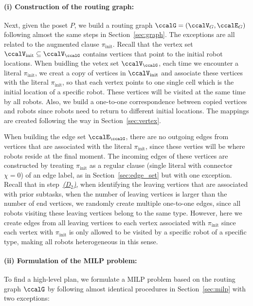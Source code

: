 \documentclass[Afour,sageh,times]{sagej}
\newcounter{mycounter}
\begin{document}
{{{  \paragraph{(i) Construction of the routing graph:}   Next, given the poset $P$, we build a routing graph $\ccalG = (\ccalV_G, \ccalE_G)$ following almost the same steps in Section~\ref{sec:graph}. The exceptions are all related to the augmented clause $\pi_{\text{init}}$.  Recall that the vertex set $\ccalV_\text{init} \subseteq \ccalV_\ccalG$ contains vertices that point to the initial robot locations. When buidling the vetex set $\ccalV_\ccalG$, each time we encounter a literal $\pi_{\text{init}}$, we creat a copy of vertices in $\ccalV_{\text{init}}$ and associate these vertices  with the literal $\pi_{\text{init}}$, so that each vertex points to one single cell which is the initial location of a specific robot.  These vertices will be visited at the same time by all robots.  Also, we build a one-to-one correspondence between copied vertices and robots since  robots need to return to different initial locations. The  mappings are created following the way in Section~\ref{sec:vertex}.

  When  building the edge set $\ccalE_\ccalG$, there are no outgoing edges from  vertices that are associated with the literal $\pi_\text{init}$, since these verties will be where robots reside at the final moment. The incoming edges of these vertices are constructed by treating $\pi_{\text{init}}$ as a regular clause (single literal with connector $\chi=0$) of an edge label, as in Section~\ref{sec:edge_set} but with one exception.  Recall that in step~\hyperref[sec:a]{\it {(D$_2$)}}, when identifying the leaving vertices that are associated with prior subtasks,  when the number of leaving vertices is larger than the number of end vertices, we randomly create multiple  one-to-one edges, since all robots visiting these leaving vertices belong to the same type. However, here we create edges from all leaving vertices to each vertex associated with $\pi_{\text{init}}$ since each vertex with $\pi_{\text{init}}$ is only allowed to be visited by a specific robot of a specific type, making all robots heterogeneous in this sense.
 \paragraph{(ii) Formulation of the MILP problem:}  To find a high-level plan, we formulate a MILP problem based on the routing graph $\ccalG$ by following almost identical procedures in Section~\ref{sec:milp} with two exceptions:

}}}
\end{document}
